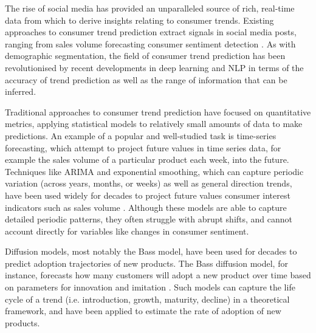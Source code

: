 \documentclass{report}
\begin{document}
The rise of social media has provided an unparalleled source of rich, real-time data from which to derive insights relating to consumer trends. Existing approaches to consumer trend prediction extract signals in social media posts, ranging from sales volume forecasting \cite{Asur2010predicting} consumer sentiment detection \cite{liu2022sentiment}. As with demographic segmentation, the field of consumer trend prediction has been revolutionised by recent developments in deep learning and NLP in terms of the accuracy of trend prediction as well as the range of information that can be inferred.

Traditional approaches to consumer trend prediction have focused on quantitative metrics, applying statistical models to relatively small amounts of data to make predictions. An example of a popular and well-studied task is time-series forecasting, which attempt to project future values in time series data, for example the sales volume of a particular product each week, into the future. Techniques like ARIMA and exponential smoothing, which can capture periodic variation (across years, months, or weeks) as well as general direction trends, have been used widely for decades to project future values consumer interest indicators such as sales volume \cite{hyndman2018forecasting}. Although these models are able to capture detailed periodic patterns, they often struggle with abrupt shifts, and cannot account directly for variables like changes in consumer sentiment.

Diffusion models, most notably the Bass model, have been used for decades to predict adoption trajectories of new products. The Bass diffusion model, for instance, forecasts how many customers will adopt a new product over time based on parameters for innovation and imitation \cite{bass1969new}. Such models can capture the life cycle of a trend (i.e. introduction, growth, maturity, decline) in a theoretical framework, and have been applied to estimate the rate of adoption of new products.
\end{document}

